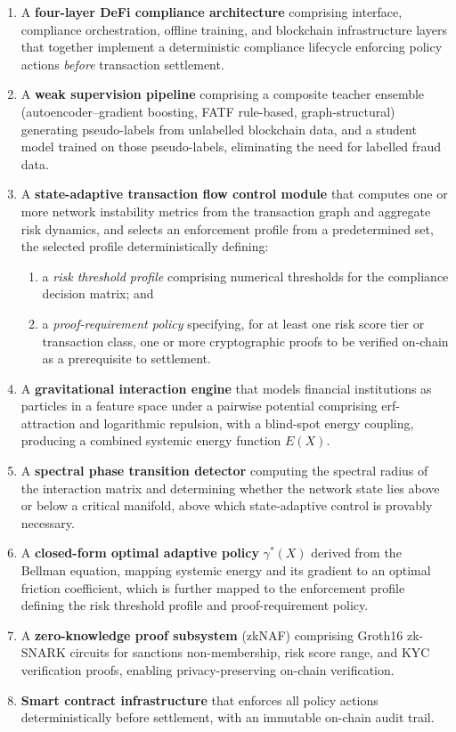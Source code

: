 \documentclass[12pt,a4paper]{article}
\begin{document}
\begin{enumerate}[label=(\roman*)]
\item A \textbf{four-layer DeFi compliance architecture} comprising interface,
compliance orchestration, offline training, and blockchain infrastructure
layers that together implement a deterministic compliance lifecycle enforcing
policy actions \emph{before} transaction settlement.

\item A \textbf{weak supervision pipeline} comprising a composite teacher
ensemble (autoencoder--gradient boosting, FATF rule-based, graph-structural)
generating pseudo-labels from unlabelled blockchain data, and a student model
trained on those pseudo-labels, eliminating the need for labelled fraud data.

\item A \textbf{state-adaptive transaction flow control module} that computes
one or more network instability metrics from the transaction graph and
aggregate risk dynamics, and selects an enforcement profile from a
predetermined set, the selected profile deterministically defining:
\begin{enumerate}[label=(\alph*)]
\item a \emph{risk threshold profile} comprising numerical thresholds for the
compliance decision matrix; and
\item a \emph{proof-requirement policy} specifying, for at least one risk
score tier or transaction class, one or more cryptographic proofs to be
verified on-chain as a prerequisite to settlement.
\end{enumerate}

\item A \textbf{gravitational interaction engine} that models financial
institutions as particles in a feature space under a pairwise potential
comprising erf-attraction and logarithmic repulsion, with a blind-spot energy
coupling, producing a combined systemic energy function $E(X)$.

\item A \textbf{spectral phase transition detector} computing the spectral
radius of the interaction matrix and determining whether the network state
lies above or below a critical manifold, above which state-adaptive control
is provably necessary.

\item A \textbf{closed-form optimal adaptive policy} $\gamma^*(X)$ derived
from the Bellman equation, mapping systemic energy and its gradient to an
optimal friction coefficient, which is further mapped to the enforcement
profile defining the risk threshold profile and proof-requirement policy.

\item A \textbf{zero-knowledge proof subsystem} (zkNAF) comprising Groth16
zk-SNARK circuits for sanctions non-membership, risk score range, and KYC
verification proofs, enabling privacy-preserving on-chain verification.

\item \textbf{Smart contract infrastructure} that enforces all policy actions
deterministically before settlement, with an immutable on-chain audit trail.
\end{enumerate}
\end{document}
